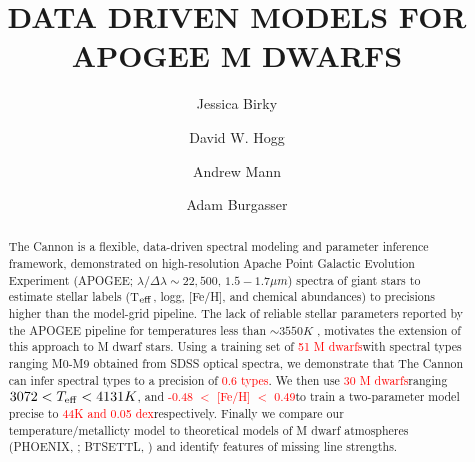 \documentclass[modern]{aastex62}
\begin{document}
\title{DATA DRIVEN MODELS FOR APOGEE M DWARFS}



\author[0000-0002-7961-6881]{Jessica Birky}

\author[0000-0003-2866-9403]{David W. Hogg}

\author[0000-0003-3654-1602]{Andrew Mann}

\author[0000-0002-6523-9536]{Adam Burgasser}

\begin{abstract}

The Cannon \citep{Ness:2015} is a flexible, data-driven spectral modeling and parameter inference framework, demonstrated on high-resolution Apache Point Galactic Evolution Experiment (APOGEE; $\lambda/\Delta\lambda\sim22,500$, $1.5-1.7 \mu m$) spectra of giant stars to estimate stellar labels (T$_{\rm eff}$, logg, [Fe/H], and chemical abundances) to precisions higher than the model-grid pipeline. The lack of reliable stellar parameters reported by the APOGEE pipeline for temperatures less than $\sim3550K$ \citep{Schmidt:2016}, motivates the extension of this approach to M dwarf stars. Using a training set of \textcolor{red}{51 M dwarfs}\textcolor{black} with spectral types ranging M0-M9 obtained from SDSS optical spectra, we demonstrate that The Cannon can infer spectral types to a precision of \textcolor{red}{0.6 types}\textcolor{black}. We then use \textcolor{red}{30 M dwarfs}\textcolor{black} ranging \textcolor{red}{$3072 < T_{\rm eff} < 4131K$}\textcolor{black}, and \textcolor{red}{-0.48 $<$ [Fe/H] $<$ 0.49}\textcolor{black} to train a two-parameter model precise to \textcolor{red}{44K and 0.05 dex}\textcolor{black} respectively. Finally we compare our temperature/metallicty model to theoretical models of M dwarf atmospheres (PHOENIX, \citealt{Husser:2013}; BTSETTL, \citealt{Allard:2011}) and identify features of missing line strengths.

\end{abstract}
\end{document}
